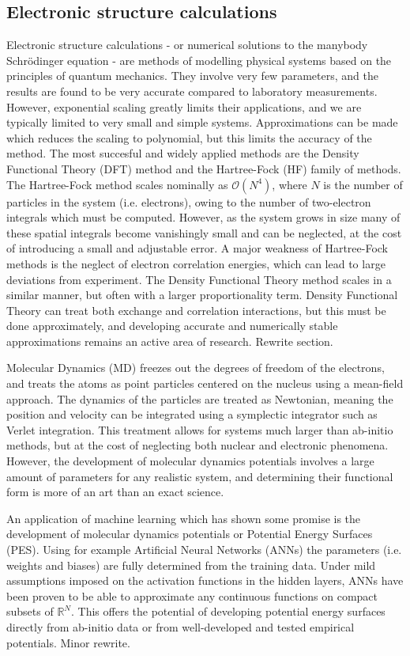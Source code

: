 \subsection{Electronic structure calculations}
Electronic structure calculations - or numerical solutions
to the manybody Schr\"{o}dinger equation - are methods of modelling
physical systems based on the principles of quantum mechanics.
They involve very few parameters, and the results are found
to be very accurate compared to laboratory measurements.
However, exponential scaling greatly limits their applications,
and we are typically limited to very small and simple systems.
Approximations can be made which reduces the scaling
to polynomial, but this limits the accuracy of the method.
The most succesful and widely applied methods
are the Density Functional Theory (DFT) method
and the Hartree-Fock (HF) family of methods.
The Hartree-Fock method scales nominally as $\mathcal{O}(N^4)$,
where $N$ is the number of particles in the system
(i.e. electrons), owing to the number of two-electron
integrals which must be computed.
However, as the system grows in size many of these spatial integrals
become vanishingly small and can be neglected, at the cost of
introducing a small and adjustable error.
A major weakness of Hartree-Fock methods is the neglect
of electron correlation energies, which can lead to
large deviations from experiment.
The Density Functional Theory method scales in a similar
manner, but often with a larger proportionality term.
Density Functional Theory can treat both exchange and correlation
interactions, but this must be done approximately,
and developing accurate and numerically stable approximations
remains an active area of research.
{\color{red} Rewrite section.}
\par
Molecular Dynamics (MD) freezes out the degrees of freedom of the
electrons, and treats the atoms as point particles centered on
the nucleus using a mean-field approach.
The dynamics of the particles are treated as Newtonian,
meaning the position and velocity can be integrated using a
symplectic integrator such as Verlet integration.
This treatment allows for systems much larger
than ab-initio methods, but at the cost of neglecting
both nuclear and electronic phenomena.
However, the development of molecular dynamics potentials
involves a large amount of parameters for any realistic system,
and determining their functional form is more of an
art than an exact science.
\par
An application of machine learning which has shown some promise
is the development of molecular dynamics potentials
or Potential Energy Surfaces (PES). Using for example
Artificial Neural Networks (ANNs) the parameters (i.e. weights and biases)
are fully determined from the training data.
Under mild assumptions imposed on the activation functions in the
hidden layers, ANNs have been proven to be able to approximate
any continuous functions on compact subsets of $\mathbb{R}^N$.
This offers the potential of developing potential energy surfaces
directly from ab-initio data or from well-developed and tested
empirical potentials.
{\color{red} Minor rewrite.}

